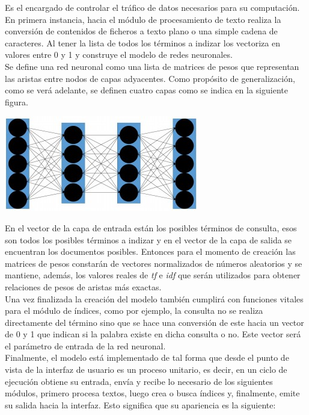 \documentclass{llncs}
\begin{document}
Es el encargado de controlar el tr\'afico de datos necesarios para su computaci\'on. En primera instancia, hacia el m\'odulo de procesamiento
de texto realiza la conversi\'on de contenidos de ficheros a texto plano o una simple cadena de caracteres. Al tener la lista de todos los t\'erminos
a indizar los vectoriza en valores entre 0 y 1 y construye el modelo de redes neuronales.\\
Se define una red neuronal como una lista de matrices de pesos que representan las aristas entre nodos de capas adyacentes. Como prop\'osito
de generalizaci\'on, como se ver\'a adelante, se definen cuatro capas como se indica en la siguiente figura.

{\includegraphics[]{model}}
{\hfil{}}

En el vector de la capa de entrada est\'an los posibles t\'erminos de consulta, esos son todos los posibles t\'erminos a indizar y en el vector de la
capa de salida se encuentran los documentos posibles. Entonces para el momento de creaci\'on las matrices de pesos constar\'an de vectores
normalizados de n\'umeros aleatorios y se mantiene, adem\'as, los valores reales de {\textit{tf}} e {\textit{idf}} que ser\'an utilizados para 
obtener relaciones de pesos de aristas m\'as exactas.\\
Una vez finalizada la creaci\'on del modelo tambi\'en cumplir\'a con funciones vitales para el m\'odulo de \'indices, como por ejemplo, la consulta
no se realiza directamente del t\'ermino sino que se hace una conversi\'on de este hacia un vector de 0 y 1 que indican si la palabra existe en dicha
consulta o no. Este vector ser\'a el par\'ametro de entrada de la red neuronal.\\
Finalmente, el modelo est\'a implementado de tal forma que desde el punto de vista de la interfaz de usuario es un proceso unitario, es decir, en un ciclo de
ejecuci\'on obtiene su entrada, env\'ia y recibe lo necesario de los siguientes m\'odulos, primero procesa textos, luego crea o busca \'indices y,
finalmente, emite su salida hacia la interfaz. Esto significa que su apariencia es la siguiente:
\end{document}
